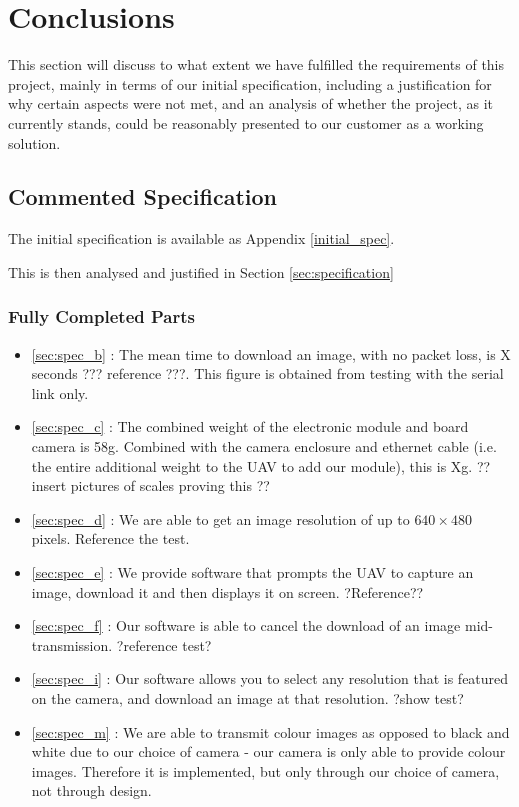 \chapter{Conclusions}

This section will discuss to what extent we have fulfilled the requirements 
of this project, mainly in terms of our initial specification, including a 
justification for why certain aspects were not met, and an analysis of 
whether the project, as it currently stands, could be reasonably presented to our customer as a working solution.

\section{Commented Specification}

The initial specification is available as Appendix \ref{initial_spec}. 

This is then analysed and justified in Section \ref{sec:specification}

\subsection{Fully Completed Parts}

\begin{itemize}
\item \ref{sec:spec_b} : The mean time to download an image, with no packet 
loss, is X seconds ??? reference ???. This figure is obtained from testing 
with the serial link only.
\item \ref{sec:spec_c} : The combined weight of the electronic module and 
board camera is 58g. Combined with the camera enclosure and ethernet cable 
(i.e. the entire additional weight to the UAV to add our module), this is Xg.
?? insert pictures of scales proving this ??
\item \ref{sec:spec_d} : We are able to get an image resolution of up to 
$640\times480$ pixels. Reference the test.
\item \ref{sec:spec_e} : We provide software that prompts the UAV to capture 
an image, download it and then displays it on screen. ?Reference??
\item \ref{sec:spec_f} : Our software is able to cancel the download of an 
image mid-transmission. ?reference test?
\item \ref{sec:spec_i} : Our software allows you to select any resolution that 
is featured on the camera, and download an image at that resolution. ?show test?
\item \ref{sec:spec_m} : We are able to transmit colour images as opposed to 
black and white due to our choice of camera - our camera is only able to 
provide colour images. Therefore it is implemented, but only through our 
choice of camera, not through design.
\end{itemize}

